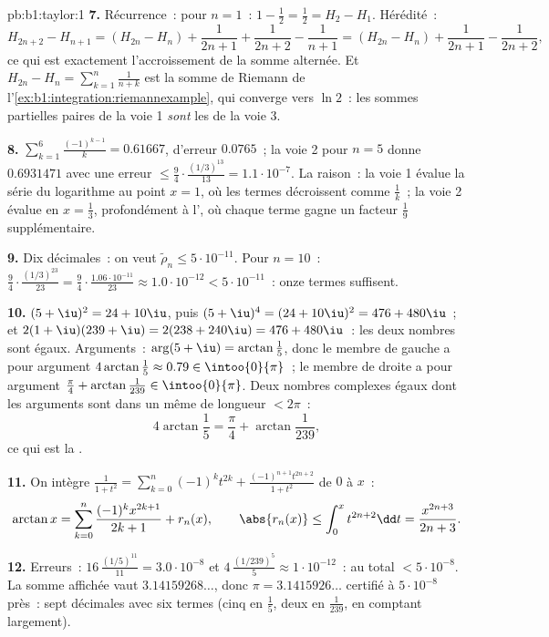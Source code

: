 \begin{solution}{pb:b1:taylor:1}
\textbf{7.} Récurrence~: pour $n = 1$~: $1 - \frac12 = \frac12 = H_2
- H_1$. Hérédité~:
\[
H_{2n+2} - H_{n+1} = (H_{2n} - H_n) + \frac{1}{2n+1} +
\frac{1}{2n+2} - \frac{1}{n+1}
= (H_{2n} - H_n) + \frac{1}{2n+1} - \frac{1}{2n+2},
\]
ce qui est exactement l'accroissement de la somme alternée. Et
$H_{2n} - H_n = \sum_{k=1}^{n}\frac{1}{n+k}$ est la somme de Riemann
de l'\cref{ex:b1:integration:riemannexample}, qui converge vers $\ln
2$~: les sommes partielles paires de la voie 1 \emph{sont} les  de la voie 3.

\textbf{8.} $\sum_{k=1}^{6}\frac{(-1)^{k-1}}{k} = 0.61667$,
d'erreur $0.0765$~; la voie 2 pour $n = 5$ donne $0.6931471$ avec une
erreur $\leq \frac94\cdot\frac{(1/3)^{13}}{13} = 1.1\cdot10^{-7}$. La
raison~: la voie 1 évalue la série du logarithme au point 
$x = 1$, où les termes décroissent comme $\frac1k$~; la voie 2
évalue en $x = \frac13$, profondément à l', où chaque terme
gagne un facteur $\frac19$ supplémentaire.

\textbf{9.} Dix décimales~: on veut $\tilde\rho_n \leq
5\cdot10^{-11}$. Pour $n = 10$~: $\frac94 \cdot
\frac{(1/3)^{23}}{23} = \frac94\cdot\frac{1.06\cdot10^{-11}}{23}
\approx 1.0\cdot10^{-12} < 5\cdot10^{-11}$~: onze termes
suffisent.

\textbf{10.} $(5+\iu)^2 = 24 + 10\iu$, puis $(5+\iu)^4 = (24 +
10\iu)^2 = 476 + 480\iu$~; et $2(1+\iu)(239+\iu) = 2(238 +
240\iu) = 476 + 480\iu$~: les deux nombres sont égaux. Arguments~:
$\arg(5 + \iu) = \arctan\frac15$, donc le membre de gauche a pour
argument $4\arctan\frac15 \approx 0.79 \in \intoo{0}{\pi}$~; le membre
de droite a pour argument $\frac\pi4 + \arctan\frac{1}{239} \in
\intoo{0}{\pi}$. Deux nombres complexes égaux dont les arguments sont
dans un même  de longueur $< 2\pi$~:
\[
4\arctan\frac15 = \frac\pi4 + \arctan\frac{1}{239} ,
\]
ce qui est la .

\textbf{11.} On intègre $\frac{1}{1+t^2} = \sum_{k=0}^n (-1)^k
t^{2k} + \frac{(-1)^{n+1}t^{2n+2}}{1+t^2}$ de $0$ à $x$~:
\[
\arctan x = \sum_{k=0}^{n}\frac{(-1)^k x^{2k+1}}{2k+1} +
r_n(x),
\qquad
\abs{r_n(x)} \leq \int_0^x t^{2n+2}\dd t =
\frac{x^{2n+3}}{2n+3} .
\]

\textbf{12.} Erreurs~: $16\,\frac{(1/5)^{11}}{11} = 3.0\cdot
10^{-8}$ et $4\,\frac{(1/239)^5}{5} \approx 1\cdot10^{-12}$~:
au total $< 5\cdot10^{-8}$. La somme affichée vaut
$3.14159268\dots$, donc $\pi = 3.1415926\dots$ certifié à
$5\cdot10^{-8}$ près~: sept décimales avec six termes (cinq en
$\frac15$, deux en $\frac1{239}$, en comptant largement).


\end{solution}
